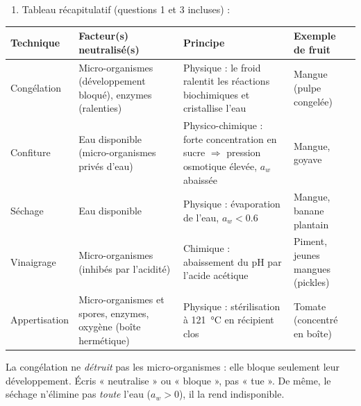 \documentclass[11pt]{article}
\begin{document}
\begin{corrige}
\begin{enumerate}
\item[2.] Tableau récapitulatif (questions 1 et 3 incluses) :
\end{enumerate}
\begin{center}
\begin{tabularx}{\linewidth}{|l|X|X|l|}
\hline
\rowcolor{popblueL} Technique & Facteur(s) neutralisé(s) & Principe & Exemple de fruit \\
\hline
Congélation & Micro-organismes (développement bloqué), enzymes (ralenties) & Physique : le froid ralentit les réactions biochimiques et cristallise l'eau & Mangue (pulpe congelée) \\
\hline
Confiture & Eau disponible (micro-organismes privés d'eau) & Physico-chimique : forte concentration en sucre $\Rightarrow$ pression osmotique élevée, $a_w$ abaissée & Mangue, goyave \\
\hline
Séchage & Eau disponible & Physique : évaporation de l'eau, $a_w < \num{0,6}$ & Mangue, banane plantain \\
\hline
Vinaigrage & Micro-organismes (inhibés par l'acidité) & Chimique : abaissement du pH par l'acide acétique & Piment, jeunes mangues (pickles) \\
\hline
Appertisation & Micro-organismes et spores, enzymes, oxygène (boîte hermétique) & Physique : stérilisation à \SI{121}{\celsius} en récipient clos & Tomate (concentré en boîte) \\
\hline
\end{tabularx}
\end{center}
\end{corrige}

\begin{attention}
La congélation ne \emph{détruit} pas les micro-organismes : elle bloque seulement leur développement. Écris « neutralise » ou « bloque », pas « tue ». De même, le séchage n'élimine pas \emph{toute} l'eau ($a_w > 0$), il la rend indisponible.
\end{attention}
\end{document}
